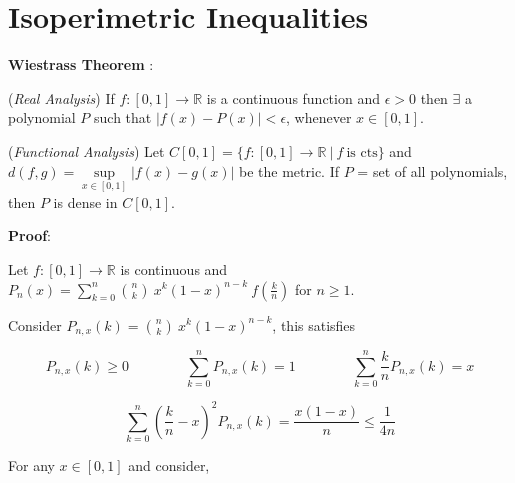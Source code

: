 \section{Isoperimetric Inequalities}


\textbf{Wiestrass Theorem} :

\vspace{0.1in}

\noindent (\textit{Real Analysis}) If $f: [0,1] \rightarrow \mathbb{R}$ is a continuous function and $\epsilon > 0$ then $\exists$ a polynomial $P$ such that  $\vert f(x)-P(x) \vert < \epsilon$,  whenever $x \in [0,1] $.

\vspace{0.1in}

\noindent (\textit{Functional Analysis}) Let $C[0,1] = \{ f: [0,1] \rightarrow \mathbb{R} \ \vert \ f \ \textrm{is cts} \}$ and
$d(f,g) = \sup\limits_{x \in [0,1]} \vert f(x) - g(x) \vert $ be the metric. If $P$ = set of all polynomials, then
$P$ is dense in $C[0,1]$.

\vspace{0.1in}

\noindent \textbf{Proof}:

Let $f: [0,1] \rightarrow \mathbb{R}$ is continuous and $P_n(x) = \sum\limits_{k=0}^{n} \binom{n}{k}\ x^k (1-x)^{n-k}\ f\left(\frac{k}{n}\right)$ for $n \geq 1$.

\vspace{0.1in}


\noindent Consider $P_{n,x}(k) = \binom{n}{k}\ x^k(1-x)^{n-k}$, this satisfies

\begin{equation*}
    P_{n,x}(k) \geq 0  \quad \quad \quad \quad  \sum\limits_{k=0}^{n} P_{n,x}(k)  = 1   \quad \quad \quad \quad
    \sum\limits_{k=0}^{n} \frac{k}{n} P_{n,x} (k) = x
\end{equation*}


\begin{equation*}
    \sum\limits_{k=0}^{n} \left( \frac{k}{n} -x\right)^2  P_{n,x} (k) = \frac{x(1-x)}{n} \leq \frac{1}{4n}
\end{equation*}

\noindent For any $x \in [0,1] $ and consider,

